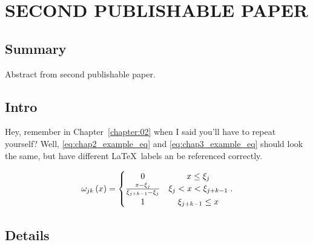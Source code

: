 \chapter{\uppercase{Second Publishable Paper} \label{chapter:03}}

\section{Summary}
Abstract from second publishable paper.

\section{Intro}

Hey, remember in Chapter~\ref{chapter:02} when I said you'll have to repeat
yourself?  Well, \eqref{eq:chap2_example_eq} and \eqref{eq:chap3_example_eq}
should look the same, but have different \LaTeX\ labels an be referenced
correctly.

\begin{equation}
\label{eq:chap3_example_eq}
  \omega_{jk}\left(x\right) =
  \begin{cases}
  \hfil 0                                        & \hfil x \leq \xi_{j} \\
  \frac{x - \xi_{j}} {\xi_{j + k - 1} - \xi_{j}} & \xi_{j} < x < \xi_{j+ k - 1} \\
  \hfil 1                                        & \hfil \xi_{j + k - 1} \leq x
  \end{cases}.
\end{equation}

\section{Details}
\lipsum
 
